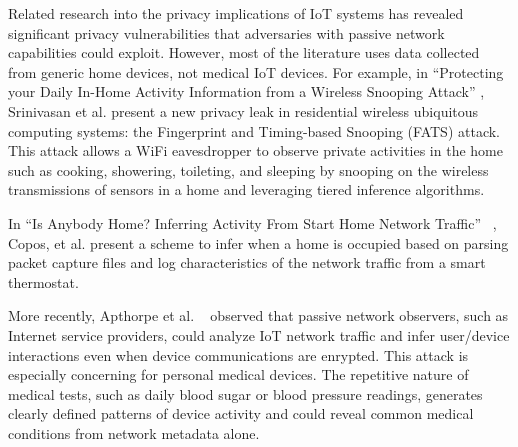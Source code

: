Related research into the privacy implications of IoT systems has revealed significant privacy vulnerabilities that adversaries with passive network capabilities could exploit. However, most of the literature uses data collected from generic home devices, not medical IoT devices. For example, in ``Protecting your Daily In-Home Activity Information from a Wireless Snooping Attack'' \cite{srinivasan2008fats}, Srinivasan et al. present a new privacy leak in residential wireless ubiquitous computing systems: the Fingerprint and Timing-based Snooping (FATS) attack. This attack allows a WiFi eavesdropper to observe private activities in the home such as cooking, showering, toileting, and sleeping by snooping on the wireless transmissions of sensors in a home and leveraging tiered inference algorithms.

In ``Is Anybody Home? Inferring Activity From Start Home Network Traffic'' ~\cite{coposIoT}, Copos, et al. present a scheme to infer when a home is occupied based on parsing packet capture files and log characteristics of the network traffic from a smart thermostat. 

More recently, Apthorpe et al. ~\cite{apthorpeIoT} observed that passive network observers, such as Internet service providers, could analyze IoT network traffic and infer user/device interactions even when device communications are enrypted. 
This attack is especially concerning for personal medical devices. The repetitive nature of medical tests, such as daily blood sugar or blood pressure readings, generates clearly defined patterns of device activity and could reveal common medical conditions from network metadata alone. 


